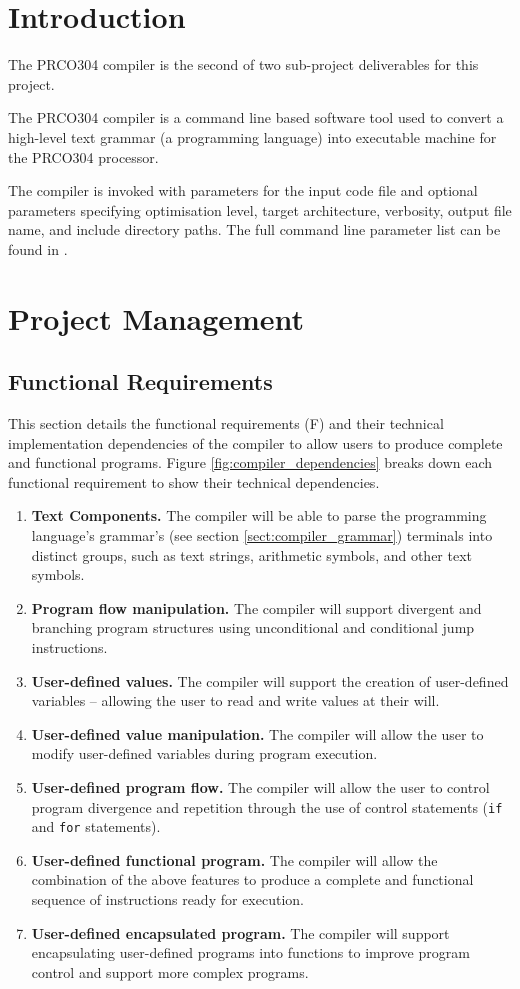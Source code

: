 \documentclass[11pt,a4paper]{report}
\newcommand{\scname}{PRCO304}
\begin{document}
\section{Introduction}
The \scname{} compiler is the second of two sub-project deliverables for this project.

The \scname{} compiler is a command line based software tool used to convert a high-level text grammar (a programming language) into executable machine for the \scname{} processor.

The compiler is invoked with parameters for the input code file and optional parameters specifying optimisation level, target architecture, verbosity, output file name, and include directory paths. The full command line parameter list can be found in {}.

\section{Project Management}
\subsection{Functional Requirements}
This section details the functional requirements (F) and their technical implementation dependencies of the compiler to allow users to produce complete and functional programs. Figure \ref{fig:compiler_dependencies} breaks down each functional requirement to show their technical dependencies.

\begin{enumerate}[label=F\arabic*.]
\item{\textbf{Text Components.} The compiler will be able to parse the programming language's grammar's (see section {}  \ref{sect:compiler_grammar}) terminals into distinct groups, such as text strings, arithmetic symbols, and other text symbols.}
\item{\textbf{Program flow manipulation.} The compiler will support divergent and branching program structures using unconditional and conditional jump instructions.}
\item{\textbf{User-defined values.} The compiler will support the creation of user-defined variables -- allowing the user to read and write values at their will.}
\item{\textbf{User-defined value manipulation.} The compiler will allow the user to modify user-defined variables during program execution.}
\item{\textbf{User-defined program flow.} The compiler will allow the user to control program divergence and repetition through the use of control statements (\verb|if| and \verb|for| statements).}
\item{\textbf{User-defined functional program.} The compiler will allow the combination of the above features to produce a complete and functional sequence of instructions ready for execution.}
\item{\textbf{User-defined encapsulated program.} The compiler will support encapsulating user-defined programs into functions to improve program control and support more complex programs.}
\end{enumerate}
\end{document}
